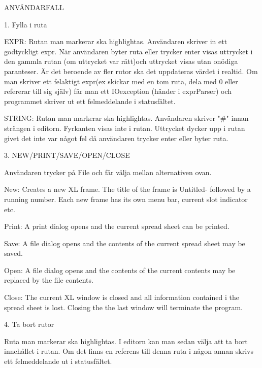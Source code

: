 ANVÄNDARFALL



1. Fylla i ruta

        EXPR: Rutan man markerar ska highlightas. Användaren skriver in ett godtyckligt expr. När användaren byter ruta eller trycker enter visas uttrycket i den gammla rutan (om uttrycket var rätt)och uttrycket visas utan onödiga paranteser. Är det beroende av fler rutor ska det uppdateras värdet i realtid. Om man skriver ett felaktigt expr(ex skickar med en tom ruta, dela med 0 eller refererar till sig själv) får man ett IOexception (händer i exprParser) och programmet skriver ut ett felmeddelande i statusfältet.

        STRING: Rutan man markerar ska highlightas. Användaren skriver "#" innan strängen i editorn. Fyrkanten visas inte i rutan. Uttrycket dycker upp i rutan givet det inte var något fel då användaren trycker enter eller byter ruta.



3. NEW/PRINT/SAVE/OPEN/CLOSE

        Användaren trycker på File och får välja mellan alternativen ovan.

        New: Creates a new XL frame. The title of the frame is Untitled- followed by a running number. Each new frame has its own menu bar, current slot indicator etc.

        Print: A print dialog opens and the current spread sheet can be printed.

        Save: A file dialog opens and the contents of the current spread sheet may be saved.

        Open: A file dialog opens and the contents of the current contents may be replaced by the file contents.

        Close: The current XL window is closed and all information contained i the spread sheet is lost. Closing the the last window will terminate the program.



4. Ta bort rutor

        Ruta man markerar ska highlightas. I editorn kan man sedan välja att ta bort innehållet i rutan. Om det finns en referens till denna ruta i någon annan skrivs ett felmeddelande ut i statusfältet.


